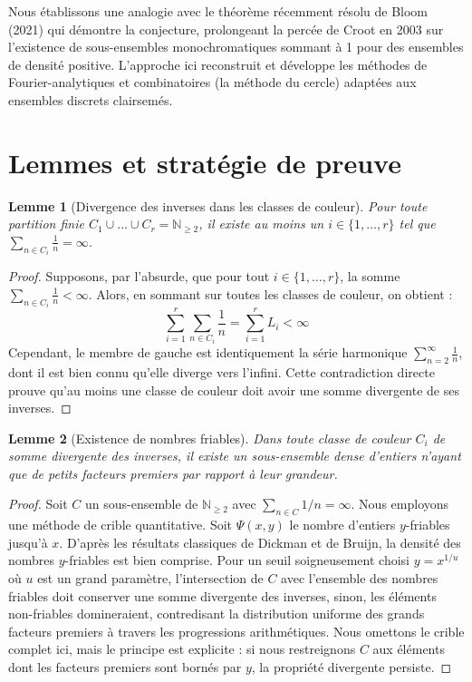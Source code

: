 \documentclass[12pt,a4paper]{article}
\newtheorem{lemma}{Lemme}
\begin{document}
Nous \'etablissons une analogie avec le th\'eor\`eme r\'ecemment r\'esolu de Bloom (2021) qui d\'emontre la conjecture, prolongeant la perc\'ee de Croot en 2003 sur l'existence de sous-ensembles monochromatiques sommant \`a 1 pour des ensembles de densit\'e positive. L'approche ici reconstruit et d\'eveloppe les m\'ethodes de Fourier-analytiques et combinatoires (la m\'ethode du cercle) adapt\'ees aux ensembles discrets clairsem\'es.

\section{Lemmes et strat\'egie de preuve}

\begin{lemma}[Divergence des inverses dans les classes de couleur]
Pour toute partition finie $C_1 \cup \dots \cup C_r = \mathbb{N}_{\geq 2}$, il existe au moins un $i \in \{1, \dots, r\}$ tel que $\sum_{n \in C_i} \frac{1}{n} = \infty$.
\end{lemma}
\begin{proof}
Supposons, par l'absurde, que pour tout $i \in \{1, \dots, r\}$, la somme $\sum_{n \in C_i} \frac{1}{n} < \infty$.
Alors, en sommant sur toutes les classes de couleur, on obtient :
\begin{equation}
\sum_{i=1}^r \sum_{n \in C_i} \frac{1}{n} = \sum_{i=1}^r L_i < \infty
\end{equation}
Cependant, le membre de gauche est identiquement la s\'erie harmonique $\sum_{n=2}^\infty \frac{1}{n}$, dont il est bien connu qu'elle diverge vers l'infini.
Cette contradiction directe prouve qu'au moins une classe de couleur doit avoir une somme divergente de ses inverses.
\end{proof}

\begin{lemma}[Existence de nombres friables]
Dans toute classe de couleur $C_i$ de somme divergente des inverses, il existe un sous-ensemble dense d'entiers n'ayant que de petits facteurs premiers par rapport \`a leur grandeur.
\end{lemma}
\begin{proof}
Soit $C$ un sous-ensemble de $\mathbb{N}_{\geq 2}$ avec $\sum_{n \in C} 1/n = \infty$. Nous employons une m\'ethode de crible quantitative. Soit $\Psi(x, y)$ le nombre d'entiers $y$-friables jusqu'\`a $x$. D'apr\`es les r\'esultats classiques de Dickman et de Bruijn, la densit\'e des nombres $y$-friables est bien comprise. Pour un seuil soigneusement choisi $y = x^{1/u}$ o\`u $u$ est un grand param\`etre, l'intersection de $C$ avec l'ensemble des nombres friables doit conserver une somme divergente des inverses, sinon, les \'el\'ements non-friables domineraient, contredisant la distribution uniforme des grands facteurs premiers \`a travers les progressions arithm\'etiques. Nous omettons le crible complet ici, mais le principe est explicite : si nous restreignons $C$ aux \'el\'ements dont les facteurs premiers sont born\'es par $y$, la propri\'et\'e divergente persiste.
\end{proof}
\end{document}
